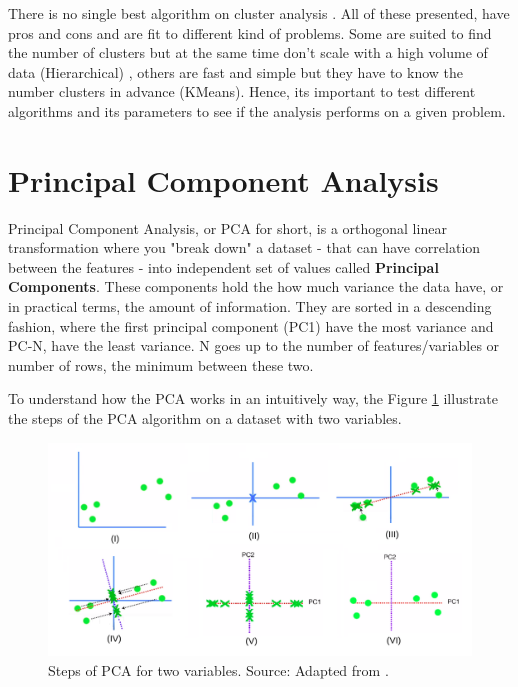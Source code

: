 There is no single best algorithm on cluster analysis \cite{james2013introduction}. All of these presented, have pros and cons and are fit to different kind of problems. Some are suited to find the number of clusters but at the same time don't scale with a high volume of data (Hierarchical) \cite{franti2006fast}, others are fast and simple but they have to know the number clusters in advance (KMeans). Hence, its important to test different algorithms and its parameters to see if the analysis performs on a given problem.

\section{Principal Component Analysis}

Principal Component Analysis, or PCA for short, is a orthogonal linear transformation \cite{wikipedia_pca} where you "break down" a dataset - that can have correlation between the features - into independent set of values called \textbf{Principal Components}. These components hold the how much variance the data have, or in practical terms, the amount of information. They are sorted in a descending fashion, where the first principal component (PC1) have the most variance and PC-N, have the least variance. N goes up to the number of features/variables or number of rows, the minimum between these two. 

To understand how the PCA works in an intuitively way, the Figure \ref{fig:pca-steps} illustrate the steps of the PCA algorithm on a dataset with two variables.

\begin{figure}[h]
   \centering
   \includegraphics[width=\linewidth]{fig/ch2-pca-steps.png}
   \caption{Steps of PCA for two variables. Source: Adapted from \cite{pcastepsyoutube}.}
   \label{fig:pca-steps}
\end{figure}

